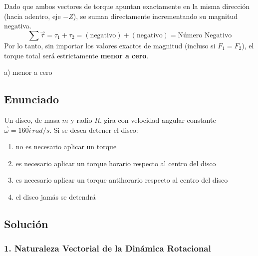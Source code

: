 \documentclass[12pt, a4paper]{article}
\begin{document}
Dado que ambos vectores de torque apuntan exactamente en la misma dirección (hacia adentro, eje $-Z$), se suman directamente incrementando su magnitud negativa.
$$ \sum \vec{\tau} = \tau_1 + \tau_2 = (\text{negativo}) + (\text{negativo}) = \text{Número Negativo} $$
Por lo tanto, sin importar los valores exactos de magnitud (incluso si $F_1 = F_2$), el torque total será estrictamente \textbf{menor a cero}.

\begin{tcolorbox}[colback=green!5!white, colframe=green!50!black, title=Respuesta Final]
\centering \Large a) menor a cero
\end{tcolorbox}

\newpage

\subsection*{Enunciado}
Un disco, de masa $m$ y radio $R$, gira con velocidad angular constante $\vec{\omega} = 160\hat{i}\,\si{rad/s}$. Si se desea detener el disco:
\begin{enumerate}[label=\alph*)]
    \item no es necesario aplicar un torque
    \item es necesario aplicar un torque horario respecto al centro del disco
    \item es necesario aplicar un torque antihorario respecto al centro del disco
    \item el disco jamás se detendrá
\end{enumerate}

\subsection*{Solución}

\subsubsection*{1. Naturaleza Vectorial de la Dinámica Rotacional}
\end{document}
